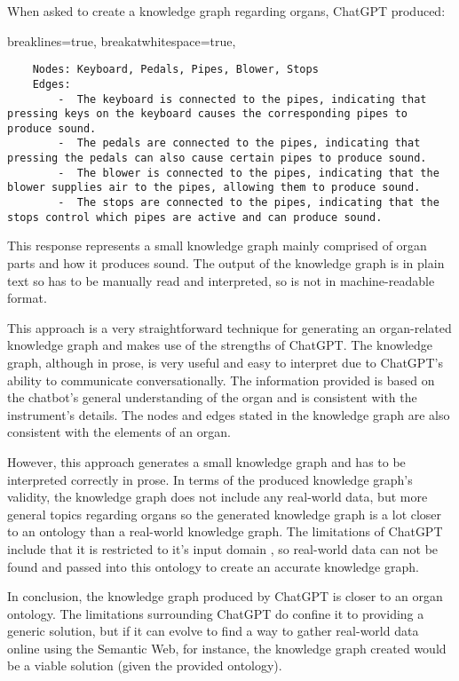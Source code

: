 When asked to create a knowledge graph regarding organs, ChatGPT produced:

\lstset
{
    breaklines=true,
    breakatwhitespace=true,
}
\begin{lstlisting}
    Nodes: Keyboard, Pedals, Pipes, Blower, Stops
    Edges:
        -  The keyboard is connected to the pipes, indicating that pressing keys on the keyboard causes the corresponding pipes to produce sound.
        -  The pedals are connected to the pipes, indicating that pressing the pedals can also cause certain pipes to produce sound.
        -  The blower is connected to the pipes, indicating that the blower supplies air to the pipes, allowing them to produce sound.
        -  The stops are connected to the pipes, indicating that the stops control which pipes are active and can produce sound.
\end{lstlisting}

This response represents a small knowledge graph mainly comprised of organ parts and how it produces sound. The output of the knowledge graph is in plain text so has to be manually read and interpreted, so is not in machine-readable format. 

This approach is a very straightforward technique for generating an organ-related knowledge graph and makes use of the strengths of ChatGPT. The knowledge graph, although in prose, is very useful and easy to interpret due to ChatGPT's ability to communicate conversationally. The information provided is based on the chatbot's general understanding of the organ and is consistent with the instrument's details. The nodes and edges stated in the knowledge graph are also consistent with the elements of an organ. 

However, this approach generates a small knowledge graph and has to be interpreted correctly in prose. In terms of the produced knowledge graph's validity, the knowledge graph does not include any real-world data, but more general topics regarding organs so the generated knowledge graph is a lot closer to an ontology than a real-world knowledge graph. The limitations of ChatGPT include that it is restricted to it's input domain \cite{chatgptwebsite}, so real-world data can not be found and passed into this ontology to create an accurate knowledge graph. 

In conclusion, the knowledge graph produced by ChatGPT is closer to an organ ontology. The limitations surrounding ChatGPT do confine it to providing a generic solution, but if it can evolve to find a way to gather real-world data online using the Semantic Web, for instance, the knowledge graph created would be a viable solution (given the provided ontology).

